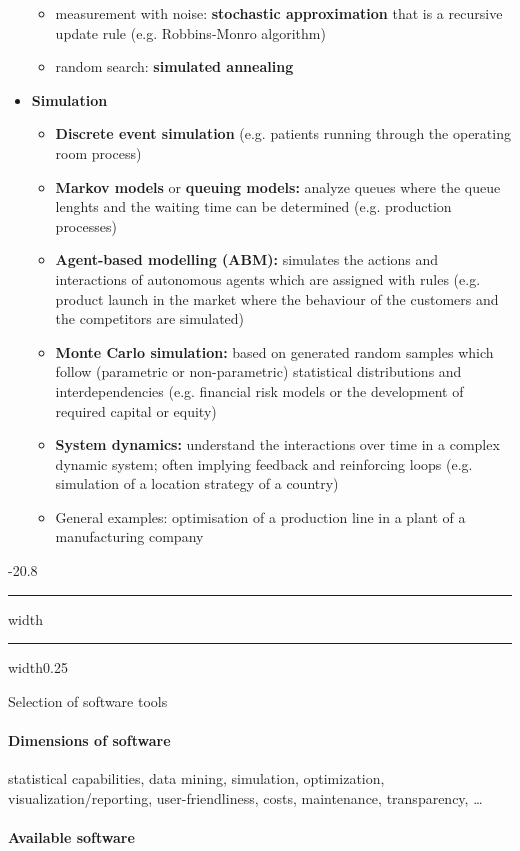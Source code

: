 \documentclass[a4paper, landscape, 6pt, fleqn]{scrartcl}
\makeatletter
\renewcommand{\emph}[1]{\textbf{#1}}
\renewcommand{\subsection}{\@startsection{subsection}{1}{0mm}%
{-2\baselineskip}{0.8\baselineskip}%
{\hrule depth 0.2pt width\columnwidth\hrule depth0.75pt
width0.25\columnwidth\vspace*{1.2em}\large\bfseries}}
\makeatother
\begin{document}
\begin{multicols*}{4}
\begin{itemize}
\begin{itemize}
\item measurement with noise: \emph{stochastic approximation} that is a recursive update rule (e.g. Robbins-Monro algorithm)
\item random search: \emph{simulated annealing}
\end{itemize}
\item \emph{Simulation}
\begin{itemize}
\item \emph{Discrete event simulation} (e.g. patients running through the operating room process)
\item \emph{Markov models} or \emph{queuing models:} analyze queues where the queue lenghts and the waiting time can be determined (e.g. production processes)
\item \emph{Agent-based modelling (ABM):} simulates the actions and interactions of autonomous agents which are assigned with rules (e.g. product launch in the market where the behaviour of the customers and the competitors are simulated)
\item \emph{Monte Carlo simulation:} based on generated random samples which follow (parametric or non-parametric) statistical distributions and interdependencies (e.g. financial risk models or the development of required capital or equity)
\item \emph{System dynamics:} understand the interactions over time in a complex dynamic system; often implying feedback and reinforcing loops (e.g. simulation of a location strategy of a country)
\item General examples: optimisation of a production line in a plant of a manufacturing company
\end{itemize}
\end{itemize}

\subsection{Selection of software tools}

\paragraph{Dimensions of software}

statistical capabilities, data mining, simulation, optimization, visualization/reporting, user-friendliness, costs, maintenance, transparency, \ldots

\paragraph{Available software}


\end{multicols*}
\end{document}
